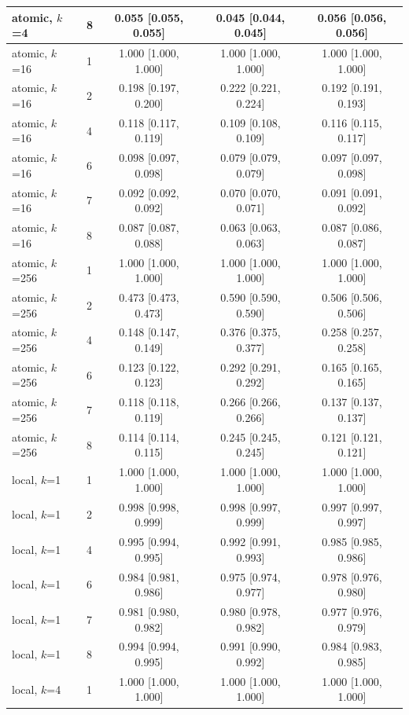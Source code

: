 {\begin{longtable}{llccc}
atomic, $k$=4 & 8 & 0.055 [0.055, 0.055] & 0.045 [0.044, 0.045] & 0.056 [0.056, 0.056] \\
\midrule
atomic, $k$=16 & 1 & 1.000 [1.000, 1.000] & 1.000 [1.000, 1.000] & 1.000 [1.000, 1.000] \\
atomic, $k$=16 & 2 & 0.198 [0.197, 0.200] & 0.222 [0.221, 0.224] & 0.192 [0.191, 0.193] \\
atomic, $k$=16 & 4 & 0.118 [0.117, 0.119] & 0.109 [0.108, 0.109] & 0.116 [0.115, 0.117] \\
atomic, $k$=16 & 6 & 0.098 [0.097, 0.098] & 0.079 [0.079, 0.079] & 0.097 [0.097, 0.098] \\
atomic, $k$=16 & 7 & 0.092 [0.092, 0.092] & 0.070 [0.070, 0.071] & 0.091 [0.091, 0.092] \\
atomic, $k$=16 & 8 & 0.087 [0.087, 0.088] & 0.063 [0.063, 0.063] & 0.087 [0.086, 0.087] \\
\midrule
atomic, $k$=256 & 1 & 1.000 [1.000, 1.000] & 1.000 [1.000, 1.000] & 1.000 [1.000, 1.000] \\
atomic, $k$=256 & 2 & 0.473 [0.473, 0.473] & 0.590 [0.590, 0.590] & 0.506 [0.506, 0.506] \\
atomic, $k$=256 & 4 & 0.148 [0.147, 0.149] & 0.376 [0.375, 0.377] & 0.258 [0.257, 0.258] \\
atomic, $k$=256 & 6 & 0.123 [0.122, 0.123] & 0.292 [0.291, 0.292] & 0.165 [0.165, 0.165] \\
atomic, $k$=256 & 7 & 0.118 [0.118, 0.119] & 0.266 [0.266, 0.266] & 0.137 [0.137, 0.137] \\
atomic, $k$=256 & 8 & 0.114 [0.114, 0.115] & 0.245 [0.245, 0.245] & 0.121 [0.121, 0.121] \\
\midrule
local, $k$=1 & 1 & 1.000 [1.000, 1.000] & 1.000 [1.000, 1.000] & 1.000 [1.000, 1.000] \\
local, $k$=1 & 2 & 0.998 [0.998, 0.999] & 0.998 [0.997, 0.999] & 0.997 [0.997, 0.997] \\
local, $k$=1 & 4 & 0.995 [0.994, 0.995] & 0.992 [0.991, 0.993] & 0.985 [0.985, 0.986] \\
local, $k$=1 & 6 & 0.984 [0.981, 0.986] & 0.975 [0.974, 0.977] & 0.978 [0.976, 0.980] \\
local, $k$=1 & 7 & 0.981 [0.980, 0.982] & 0.980 [0.978, 0.982] & 0.977 [0.976, 0.979] \\
local, $k$=1 & 8 & 0.994 [0.994, 0.995] & 0.991 [0.990, 0.992] & 0.984 [0.983, 0.985] \\
\midrule
local, $k$=4 & 1 & 1.000 [1.000, 1.000] & 1.000 [1.000, 1.000] & 1.000 [1.000, 1.000] \\

\end{longtable}}
